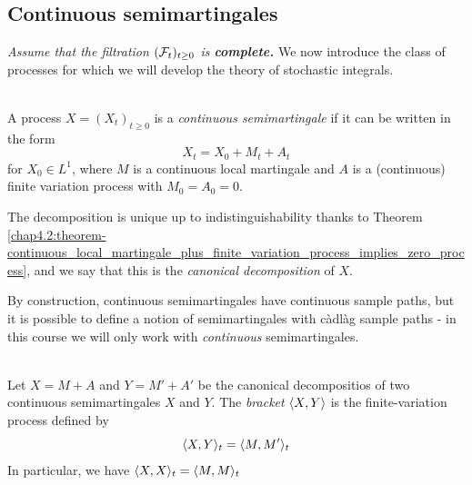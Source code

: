 \subsection{Continuous semimartingales}\label{sec:continuous_semimartingales}
\textit{Assume that the filtration $(\mathcal{F}_t)_{t\geq0}$ is \textbf{complete.}} We now introduce the class of processes for which we will develop the theory of stochastic integrals.

\begin{definition}\label{chap4.5:definition-continuous_semimartingale}
 \\
A process $X=(X_t)_{t \geq 0}$ is a \textit{continuous semimartingale} if it can be written in the form
$$X_t = X_0+M_t + A_t$$
for $X_0 \in L^1$, where $M$ is a continuous local martingale and $A$ is a (continuous) finite variation process with $M_0=A_0=0$.
\end{definition}
The decomposition is unique up to indistinguishability thanks to Theorem \ref{chap4.2:theorem-continuous_local_martingale_plus_finite_variation_process_implies_zero_process}, and we say that this is the \textit{canonical decomposition} of $X$.

By construction, continuous semimartingales have continuous sample paths, but it is possible to define a notion of semimartingales with càdlàg sample paths - in this course we will only work with \textit{continuous} semimartingales. 

\begin{definition}\label{chap4.5:definition-semimartingale_bracket_process}
 \\
Let $X=M+A$ and $Y=M'+A'$ be the canonical decompositios of two continuous semimartingales $X$ and $Y$. The \textit{bracket} $\langle X,Y\rangle$ is the finite-variation process defined by
$$\langle X,Y\rangle_t = \langle M,M'\rangle_t$$
In particular, we have $\langle X,X\rangle_t = \langle M,M\rangle_t$
\end{definition}

